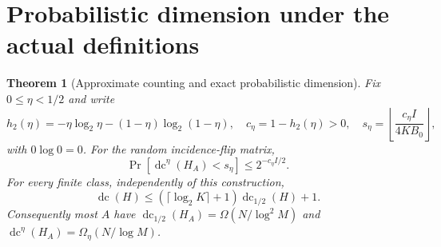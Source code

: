 \documentclass[11pt]{article}
\newtheorem{theorem}{Theorem}
\DeclareMathOperator{\dc}{dc}
\newcommand{\1}{\mathbf 1}
\begin{document}
\section{Probabilistic dimension under the actual definitions}
\begin{samepage}
\begin{theorem}[Approximate counting and exact probabilistic dimension]\label{thm:prob}
Fix $0\le\eta<1/2$ and write
\[
 h_2(\eta)=-\eta\log_2\eta-(1-\eta)\log_2(1-\eta),\quad
 c_\eta=1-h_2(\eta)>0,
 \quad s_\eta=\left\lfloor\frac{c_\eta I}{4KB_0}\right\rfloor,
\]
with $0\log 0=0$. For the random incidence-flip matrix,
\begin{equation}\label{eq:approx-prob}
 \Pr[\dc^\eta(H_A)<s_\eta]\le2^{-c_\eta I/2}.
\end{equation}
For every finite class, independently of this construction,
\begin{equation}\label{eq:exact-prob}
 \dc(H)\le(\lceil\log_2 K\rceil+1)\dc_{1/2}(H)+1.
\end{equation}
Consequently most $A$ have $\dc_{1/2}(H_A)=\Omega(N/\log^2M)$ and $\dc^\eta(H_A)=\Omega_\eta(N/\log M)$.
\end{theorem}
\end{samepage}
\end{document}
